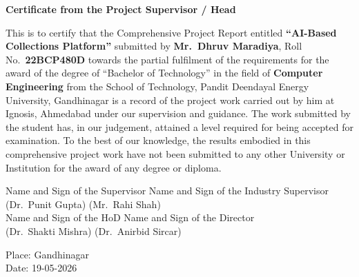 \thispagestyle{plain}
\begin{center}
{\Large \bf Certificate from the Project Supervisor / Head}
\end{center}
\vspace{0.6cm}

\begin{justify}
This is to certify that the Comprehensive Project Report entitled {\bf ``AI-Based Collections Platform''} submitted by {\bf Mr.~Dhruv Maradiya}, Roll No.\ {\bf 22BCP480D} towards the partial fulfilment of the requirements for the award of the degree of ``Bachelor of Technology'' in the field of {\bf Computer Engineering} from the School of Technology, Pandit Deendayal Energy University, Gandhinagar is a record of the project work carried out by him at Ignosis, Ahmedabad under our supervision and guidance. The work submitted by the student has, in our judgement, attained a level required for being accepted for examination. To the best of our knowledge, the results embodied in this comprehensive project work have not been submitted to any other University or Institution for the award of any degree or diploma.
\end{justify}

\vspace{2.5cm}

\begin{center}
Name and Sign of the Supervisor \hspace{1cm} Name and Sign of the Industry Supervisor\\
(Dr.~Punit Gupta) \hspace{3cm} (Mr.~Rahi Shah)\\[2cm]
Name and Sign of the HoD \hspace{1.5cm} Name and Sign of the Director\\
(Dr.~Shakti Mishra) \hspace{2.6cm} (Dr.~Anirbid Sircar)\\
\end{center}

\vspace{1.5cm}

\noindent
Place: Gandhinagar\\[0.3cm]
Date: 19-05-2026

\clearpage
